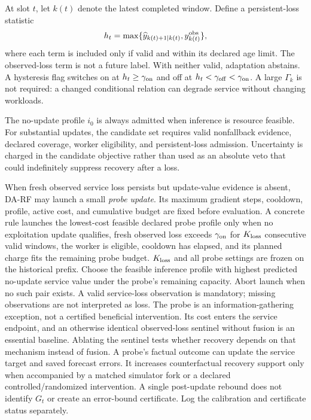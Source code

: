 \documentclass[10pt]{article}
\begin{document}
At slot $t$, let $k(t)$ denote the latest completed window.
Define a persistent-loss statistic
\begin{equation}
 h_t=\max\{\widehat y_{k(t)+1|k(t)},y_{k(t)}^{\rm obs}\},
 \label{eq:loss-sentinel}
\end{equation}
where each term is included only if valid and within its declared age limit.
The observed-loss term is not a future label. With neither valid, adaptation
abstains. A hysteresis flag switches on at $h_t\ge\gamma_{\rm on}$ and off
at $h_t<\gamma_{\rm off}<\gamma_{\rm on}$. A large $\Gamma_k$ is not required:
a changed conditional relation can degrade service without changing workloads.

The no-update profile $i_0$ is always admitted when inference is resource feasible.
For substantial updates, the candidate set requires valid nonfallback evidence,
declared coverage, worker eligibility, and persistent-loss admission. Uncertainty
is charged in the candidate objective rather than used as an absolute veto that
could indefinitely suppress recovery after a loss.

When fresh observed service loss persists but update-value evidence is absent,
DA-RF may launch a small \emph{probe update}. Its maximum gradient steps,
cooldown, profile, active cost, and cumulative budget are fixed before evaluation.
A concrete rule launches the lowest-cost feasible declared probe profile only
when no exploitation update qualifies, fresh observed loss exceeds
$\gamma_{\rm on}$ for $K_{\rm loss}$ consecutive valid windows, the worker is
eligible, cooldown has elapsed, and its planned charge fits the remaining probe
budget. $K_{\rm loss}$ and all probe settings are frozen on the historical prefix.
Choose the feasible inference profile with highest predicted no-update service
value under the probe's remaining capacity. Abort launch when no such pair exists.
A valid service-loss observation is mandatory; missing observations are not
interpreted as loss. The probe is an information-gathering exception, not a
certified beneficial intervention. Its cost enters the service endpoint, and an
otherwise identical observed-loss sentinel without fusion is an essential
baseline. Ablating the sentinel tests whether recovery depends on that mechanism
instead of fusion.
A probe's factual outcome can update the service target and saved forecast
errors. It increases counterfactual recovery support only when accompanied by
a matched simulator fork or a declared controlled/randomized intervention.
A single post-update rebound does not identify $G_t$ or create an error-bound
certificate. Log the calibration and certificate status separately.
\end{document}
